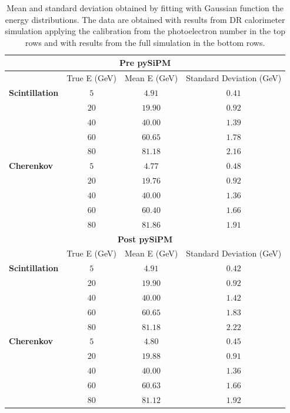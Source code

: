 \begin{table}
	\centering
	\begin{tabular}{lccc}
	    \toprule
	    \multicolumn{4}{c}{\textbf{Pre pySiPM}}\\
		\midrule
		& True E (GeV) & Mean E (GeV) & Standard Deviation (GeV) \\
		\midrule
		\textbf{Scintillation} &	$5$ 	& $4.91$ & $0.41$ \\
		& $20$ 	& $19.90$ & $0.92$ \\
		& $40$ 	& $40.00$ & $1.39$ \\
		& $60$ 	& $60.65$ & $1.78$ \\
		& $80$ 	& $81.18$ & $2.16$ \\
		\midrule
		\textbf{Cherenkov} & $5$ 	& $4.77$ & $0.48$ \\
		& $20$ 	& $19.76$ & $0.92$ \\
		& $40$ 	& $40.00$ & $1.36$ \\
		& $60$ 	& $60.40$ & $1.66$ \\
		& $80$ 	& $81.86$ & $1.91$ \\
		\toprule
	    \multicolumn{4}{c}{\textbf{Post pySiPM}}\\
		\midrule
		& True E (GeV) & Mean E (GeV) & Standard Deviation (GeV) \\
		\midrule
		\textbf{Scintillation} &	$5$ 	& $4.91$ & $0.42$ \\
		& $20$ 	& $19.90$ & $0.92$ \\
		& $40$ 	& $40.00$ & $1.42$ \\
		& $60$ 	& $60.65$ & $1.83$ \\
		& $80$ 	& $81.18$ & $2.22$ \\
		\midrule
		\textbf{Cherenkov} & $5$ 	& $4.80$ & $0.45$ \\
		& $20$ 	& $19.88$ & $0.91$ \\
		& $40$ 	& $40.00$ & $1.36$ \\
		& $60$ 	& $60.63$ & $1.66$ \\
		& $80$ 	& $81.12$ & $1.92$ \\
		\bottomrule
	\end{tabular}
	\caption{Mean and standard deviation obtained by fitting with Gaussian function the energy distributions. The data are obtained with results from DR calorimeter simulation applying the calibration from the photoelectron number in the top rows and with results from the full simulation in the bottom rows.}
	\label{tab:e_res_pe}
\end{table}

